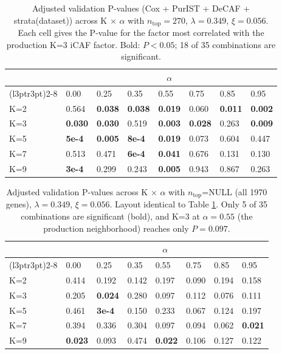 \documentclass[
]{article}
\begin{document}
\begin{table}[!h]
\centering
\caption{\label{tab:tab-ksens-adjp-ntop270}Adjusted validation P-values (Cox + PurIST + DeCAF + strata(dataset)) across K $\times$ $\alpha$ with $n_{\text{top}}=270$, $\lambda=0.349$, $\xi=0.056$. Each cell gives the P-value for the factor most correlated with the production K=3 iCAF factor. Bold: $P < 0.05$; 18 of 35 combinations are significant.}
\centering
\fontsize{9}{11}\selectfont
\begin{tabular}[t]{llllllll}
\toprule
\multicolumn{1}{c}{ } & \multicolumn{7}{c}{$\alpha$} \\
\cmidrule(l{3pt}r{3pt}){2-8}
  & 0.00 & 0.25 & 0.35 & 0.55 & 0.75 & 0.85 & 0.95\\
\midrule
K=2 & 0.564 & \textbf{0.038} & \textbf{0.038} & \textbf{0.019} & 0.060 & \textbf{0.011} & \textbf{0.002}\\
K=3 & \textbf{0.030} & \textbf{0.030} & 0.519 & \textbf{0.003} & \textbf{0.028} & 0.263 & \textbf{0.009}\\
K=5 & \textbf{5e-4} & \textbf{0.005} & \textbf{8e-4} & \textbf{0.019} & 0.073 & 0.604 & 0.447\\
K=7 & 0.513 & 0.471 & \textbf{6e-4} & \textbf{0.041} & 0.676 & 0.131 & 0.130\\
K=9 & \textbf{3e-4} & 0.299 & 0.243 & \textbf{0.005} & 0.943 & 0.867 & 0.263\\
\bottomrule
\end{tabular}
\end{table}

\begin{table}[!h]
\centering
\caption{\label{tab:tab-ksens-adjp-allgenes}Adjusted validation P-values across K $\times$ $\alpha$ with $n_{\text{top}}$=NULL (all 1970 genes), $\lambda=0.349$, $\xi=0.056$. Layout identical to Table \ref{tab:tab-ksens-adjp-ntop270}. Only 5 of 35 combinations are significant (bold), and K=3 at $\alpha=0.55$ (the production neighborhood) reaches only $P = 0.097$.}
\centering
\fontsize{9}{11}\selectfont
\begin{tabular}[t]{llllllll}
\toprule
\multicolumn{1}{c}{ } & \multicolumn{7}{c}{$\alpha$} \\
\cmidrule(l{3pt}r{3pt}){2-8}
  & 0.00 & 0.25 & 0.35 & 0.55 & 0.75 & 0.85 & 0.95\\
\midrule
K=2 & 0.414 & 0.192 & 0.142 & 0.197 & 0.090 & 0.194 & 0.158\\
K=3 & 0.205 & \textbf{0.024} & 0.280 & 0.097 & 0.112 & 0.076 & 0.111\\
K=5 & 0.461 & \textbf{3e-4} & 0.150 & 0.233 & 0.067 & 0.124 & 0.197\\
K=7 & 0.394 & 0.336 & 0.304 & 0.097 & 0.094 & 0.062 & \textbf{0.021}\\
K=9 & \textbf{0.023} & 0.093 & 0.474 & \textbf{0.022} & 0.106 & 0.127 & 0.122\\
\bottomrule
\end{tabular}
\end{table}
\end{document}

